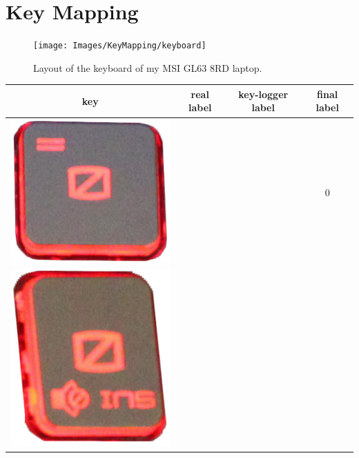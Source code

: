 \appendix
\chapter{Key Mapping}\label{chapter:keymapping}
\begin{figure}[h]
     \centering
     \texttt{[image: Images/KeyMapping/keyboard]}
     \caption{\footnotesize{Layout of the keyboard of my MSI GL63 8RD laptop.}}\label{keymapping:keyboard}
\end{figure}

\begin{longtable}{cccc}
\hline
\textbf{key} & \textbf{real label} & \textbf{key-logger label} & \textbf{final label}\\
\hline
\begin{minipage}[c]{.3\textwidth}
\vspace{0.2cm}
\includegraphics[scale=0.1]{Images/KeyMapping/0}
\vspace{0.2cm}
\end{minipage} & & & 0 \\
\hline
\begin{minipage}[c]{.3\textwidth}
\vspace{0.2cm}
\includegraphics[scale=0.1]{Images/KeyMapping/0_INSERT}

\end{minipage}
\end{longtable}
